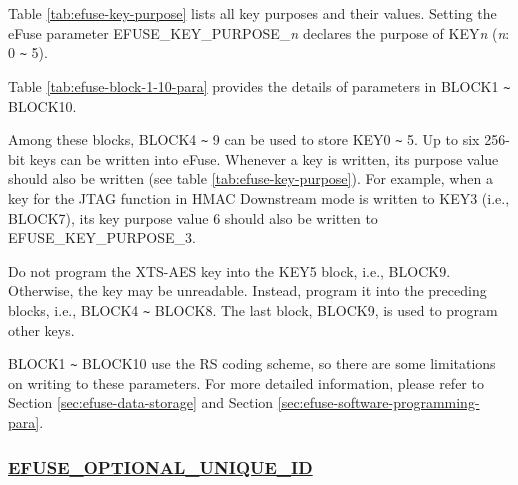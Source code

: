 \documentclass[main\_\_EN.tex]{subfiles}
\begin{document}
\clearpage
\begin{landscape}



\end{landscape}
\restoregeometry
\clearpage


Table \ref{tab:efuse-key-purpose} lists all key purposes and their values. Setting the eFuse parameter EFUSE\_KEY\_PURPOSE\_\textcolor{myred}{\it{n}} declares the purpose of KEY\textcolor{myred}{\it{n}} (\textcolor{myred}{\it{n}}: 0 \verb+~+ 5).



Table  \ref{tab:efuse-block-1-10-para} provides the details of parameters in BLOCK1 \verb+~+ BLOCK10. 

\clearpage
\begin{landscape}


\end{landscape}
\restoregeometry
\clearpage



Among these blocks, BLOCK4 \verb+~+ 9 can be used to store KEY0 \verb+~+ 5. Up to six 256-bit keys can be written into eFuse. Whenever a key is written, its purpose value should also be written (see table \ref{tab:efuse-key-purpose}). For example, when a key for the JTAG function in HMAC Downstream mode is written to KEY\textcolor{myred}{3} (i.e., BLOCK7), its key purpose value 6 should also be written to EFUSE\_KEY\_PURPOSE\_\textcolor{myred}{3}.

\begin{tiplisting}
Do not program the XTS-AES key into the KEY5 block, i.e., BLOCK9. Otherwise, the key may be unreadable. Instead, program it into the preceding blocks, i.e., BLOCK4 \verb+~+ BLOCK8. The last block, BLOCK9, is used to program other keys.
\end{tiplisting}

BLOCK1 \verb+~+ BLOCK10 use the RS coding scheme, so there are some limitations on writing to these parameters. For more detailed information, please refer to Section \ref{sec:efuse-data-storage} and Section \ref{sec:efuse-software-programming-para}.

\subsubsection{\texorpdfstring{\hyperref[fielddesc:EFUSEOPTIONALUNIQUEID]{EFUSE\_OPTIONAL\_UNIQUE\_ID}}{EFUSE\_OPTIONAL\_UNIQUE\_ID}}
\label{sec:efuse-optional-unique-id}
\end{document}
